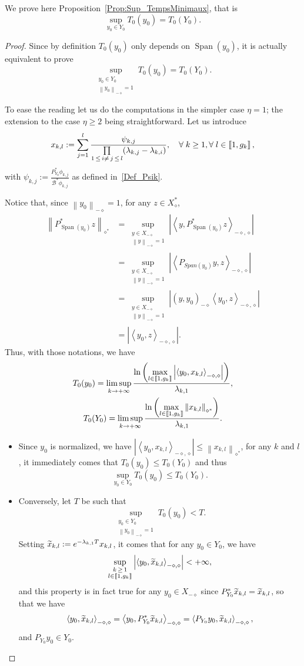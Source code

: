 \documentclass[AHL,Unicode,longabstracts]{cedram}
\newcommand{\llbracket}{\mathopen{[\mkern -2.7mu[}}
\newcommand{\rrbracket}{\mathclose{]\mkern -2.7mu]}}
\newcommand{\inter}[2]{\llbracket #1,#2 \rrbracket}
\newcommand\Bs{\mathcal{B}^*}
\newcommand{\Xalphas}{X_\diamond^*}
\newcommand{\Xmalpha}{X_{-\diamond}}
\newcommand{\Fzp}{Y_0}
\newcommand{\normeXalphas}[1]{\left\| #1 \right\|_{\diamond^*}}
\newcommand{\normeXmalpha}[1]{\left\| #1 \right\|_{-\diamond}}
\newcommand{\psXmalpha}[2]{\left(#1, #2 \right)_{-\diamond}}
\newcommand{\dual}[2]{\left\langle #1, #2 \right\rangle_{-\diamond,\diamond}}
\newcommand{\PF}{P_{\Fzp}}
\newcommand{\PFa}{P_{\Fzp}^*}
\newcommand{\n}{g}
\DeclareMathOperator{\Span}{Span}
\let\oldtilde\tilde
\renewcommand*{\tilde}[1]{\mathchoice{\widetilde{#1}}{\widetilde{#1}}{\oldtilde{#1}}{\oldtilde{#1}}}\let\oldexists\exists
\renewcommand*{\exists}{\mathrel{\oldexists}}
\let\oldforall\forall
\renewcommand*{\forall}{\mathrel{\oldforall}}
\begin{document}
We prove here Proposition~\ref{Prop:Sup_TempsMinimaux}, that is
\[
\sup_{y_0\in \Fzp} T_{0}(y_0) = T_{0}(\Fzp).
\]
\begin{proof}
Since by definition $T_0(y_0)$ only depends on $\Span(y_0)$, it is actually equivalent to prove
\[
\sup_{\substack{y_0\in \Fzp \\ \normeXmalpha{y_0}=1}} T_{0}(y_0) = T_{0}(\Fzp).
\]

To ease the reading let us do the computations in the simpler case $\eta=1$; the extension to the case $\eta \geq 2$ being straightforward. Let us introduce
\[
x_{k,l} := \sum\limits_{j=1}^l \frac{\psi_{k,j} }{\prod\limits_{1\,\leq\,i \neq\,j\,\leq\,l} (\lambda_{k,j}-\lambda_{k,i})},\quad \forall k\geq 1, \forall l\in \inter{1}{\n_k}\,,
\]
with $\psi_{k,j} := \frac{\PFa \phi_{k,j}}{\Bs \phi_{k,j}}$ as defined in~\eqref{Def_Psik}.



Notice that, since $\normeXmalpha{y_0} =1$, for any $z \in \Xalphas$,
\begin{align*}
\normeXalphas{ P_{\Span(y_0)}^* z } &= \sup\limits_{ \substack{ y \in \Xmalpha \\ \normeXmalpha{y}=1 } } \left| \dual{y}{P_{\Span(y_0)}^*z} \right|
\\
&= \sup\limits_{ \substack{ y \in \Xmalpha \\ \normeXmalpha{y}=1 } } \left| \dual{P_{Span(y_0)}y}{z} \right|
\\
&= \sup\limits_{ \substack{ y \in \Xmalpha \\ \normeXmalpha{y}=1 } } \left| \psXmalpha{y}{y_0} \dual{y_0}{z} \right|
\\
&= \left| \dual{y_0}{z} \right|.
\end{align*}
Thus, with those notations, we have
\begin{gather*}
T_0(y_0) = \limsup_{k\to+\infty} \frac{\ln \left(\max\limits_{l\in \inter{1}{\n_k}} \left| \dual{y_0}{x_{k,l}} \right| \right)}{\lambda_{k,1}},
\\
T_0(\Fzp) = \limsup_{k\to+\infty} \frac{\ln \left(\max\limits_{l\in \inter{1}{\n_k}} \normeXalphas{x_{k,l}} \right)}{\lambda_{k,1}}.
\end{gather*}
\begin{itemize}
\item Since $y_0$ is normalized, we have $\left|\dual{y_0}{x_{k,l}} \right| \leq \normeXalphas{x_{k,l}}$, for any $k$ and $l$, it immediately comes that $T_0(y_0)\leq T_0(\Fzp)$ and thus
\[
\sup_{y_0 \in \Fzp} T_0(y_0) \leq T_0(\Fzp).
\]
\item Conversely, let $T$ be such that
\[
\sup_{\substack{y_0\in \Fzp \\ \normeXmalpha{y_0}=1}} T_0(y_0) < T.
\]
Setting $\tilde{x}_{k,l} := e^{-\lambda_{k,1} T} x_{k,l}$, it comes that for any $y_0 \in \Fzp$, we have
\[
\sup_{\substack{k\,\geq\,1 \\ l\in \inter{1}{\n_k}}} \left| \dual{y_0}{\tilde{x}_{k,l}} \right| < + \infty,
\]
and this property is in fact true for any $y_0\in \Xmalpha$ since $\PFa \tilde{x}_{k,l} = \tilde{x}_{k,l}$, so that we have
\[
\dual{y_0}{\tilde{x}_{k,l}} = \dual{y_0}{\PFa \tilde{x}_{k,l}} = \dual{\PF y_0}{ \tilde{x}_{k,l}},
\]
and $\PF y_0\in \Fzp$.


\end{itemize}
\end{proof}
\end{document}
